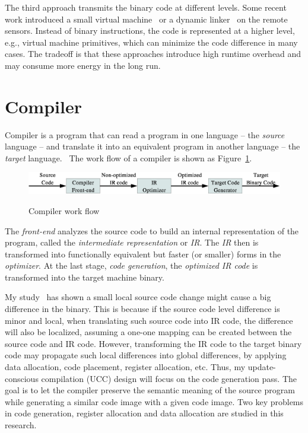 The third approach transmits the binary code at different levels.  Some recent work introduced a small virtual machine~\cite{mate} or a dynamic linker~\cite{related:dynamic2,related:dynamic1} on the remote sensors. Instead of binary instructions, the code is represented at a higher level, e.g., virtual machine primitives,
which can minimize the code difference in many cases. The tradeoff is that these approaches introduce high runtime overhead and may consume more energy in the long run.


\section{Compiler}

Compiler is a program that can read a program in one language -- the \textit{source} language -- and translate it into an equivalent program in another language -- the \textit{target} language.~\cite{compiler}
The work flow of a compiler is shown as Figure~\ref{fig:compiler}.

\begin{figure}[htbp]
	\centering
		\includegraphics[scale=0.45]{figures/compiler.eps}
	\label{fig:compiler}
	\caption{Compiler work flow}
\end{figure}

The \textit{front-end} analyzes the source code to build an internal representation of the program, called the \textit{intermediate representation} or \textit{IR}. The \textit{IR} then is transformed into functionally equivalent but faster (or smaller) forms in the \textit{optimizer}. At the last stage, \textit{code generation}, the \textit{optimized IR code} is transformed into the target machine binary.

My study~\cite{ucc} has shown a small local source code change might cause a big difference in the binary. This is because if the source code level difference is minor and local, when translating such source code into IR code, the difference will also be localized, assuming a one-one mapping can be created between the source code and IR code. However, transforming the IR code to the target binary code may propagate such local differences into global differences, by applying data allocation, code placement, register allocation, etc. Thus, my update-conscious compilation (UCC) design will focus on the code generation pass. The goal is to let the compiler preserve the semantic meaning of the source program while generating a similar code image with a given code image. Two key problems in code generation, register allocation and data allocation are studied in this research.


